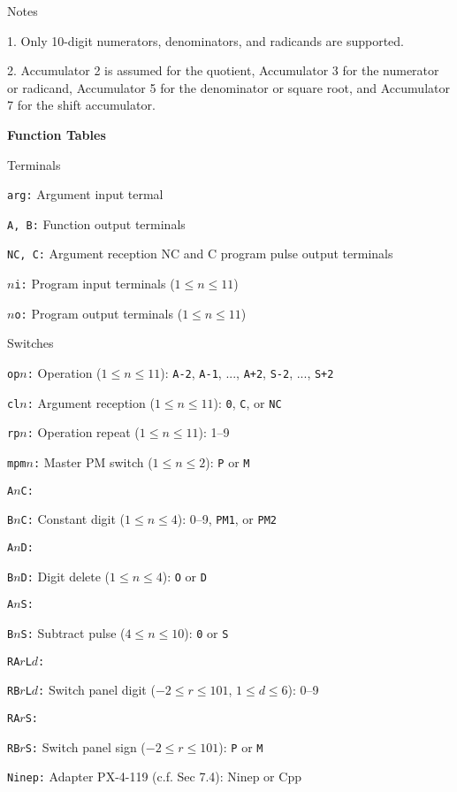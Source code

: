Notes

{\advance\leftskip 0.5in
\item{1.} Only 10-digit numerators, denominators, and radicands are supported.
\item{2.} Accumulator 2 is assumed for the quotient, Accumulator 3 for the numerator or radicand,
Accumulator 5 for the denominator or square root, and Accumulator 7 for the shift accumulator.

}

\vfill\eject
\noindent
{\bf Function Tables}

Terminals

{\advance\leftskip 0.75in
\item{\tt arg:} Argument input termal
\item{\tt A, B:} Function output terminals
\item{\tt NC, C:} Argument reception NC and C program pulse output terminals
\item{\tt $n$i:} Program input terminals ($1\le n\le 11$)
\item{\tt $n$o:} Program output terminals ($1\le n\le 11$)

}

Switches

{\advance\leftskip 0.75in
\item{\tt op$n$:} Operation ($1\le n\le 11$): {\tt A-2}, {\tt A-1}, ..., {\tt A+2}, {\tt S-2}, ..., {\tt S+2}
\item{\tt cl$n$:} Argument reception ($1\le n\le 11$): {\tt 0}, {\tt C}, or {\tt NC}
\item{\tt rp$n$:} Operation repeat ($1\le n\le 11$): 1--9
\item{\tt mpm$n$:} Master PM switch ($1\le n\le 2$): {\tt P} or {\tt M}
\item{\tt A$n$C:}
\item{\tt B$n$C:} Constant digit ($1\le n\le 4$): 0--9, {\tt PM1}, or {\tt PM2}
\item{\tt A$n$D:}
\item{\tt B$n$D:} Digit delete ($1\le n\le 4$): {\tt O} or {\tt D}
\item{\tt A$n$S:}
\item{\tt B$n$S:} Subtract pulse ($4\le n\le 10$): {\tt 0} or {\tt S}
\item{\tt RA$r$L$d$:}
\item{\tt RB$r$L$d$:} Switch panel digit ($-2\le r\le 101$, $1\le d\le 6$): 0--9
\item{\tt RA$r$S:}
\item{\tt RB$r$S:} Switch panel sign ($-2\le r\le 101$): {\tt P} or {\tt M}
\item{\tt Ninep:} Adapter PX-4-119 (c.f. Sec 7.4): Ninep or Cpp

}

